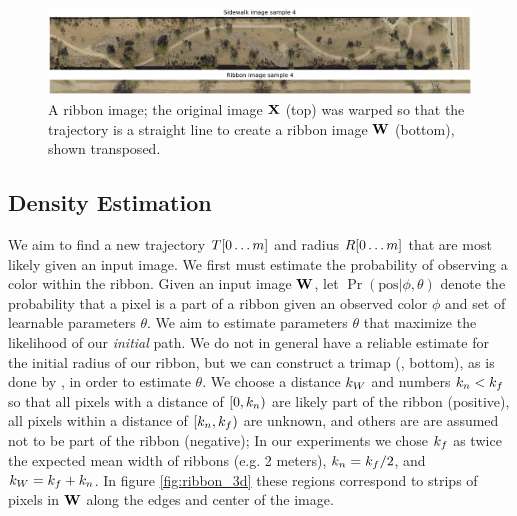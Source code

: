 
\begin{figure}[ht]
    \centering
    \includegraphics[width=0.95\columnwidth]{Figures/Sample4_needed.png}
    \caption[Sample Sidewalk]{A ribbon image; the original image $\mathbf{X}{}$ (top) was warped so that the trajectory is a straight line to create a ribbon image $\mathbf{W}{}$ (bottom), shown transposed.}
    \label{fig:Sample_Sidewalk_4}
\end{figure}

\subsection{Density Estimation}
We aim to find a new trajectory $T{[0\dots m]}$ and radius $R{[0\dots m]}$ that are most likely given an input image. We first must estimate the probability of observing a color within the ribbon.  
Given an input image $\mathbf{W}{}$, let $\Pr(\text{pos}|\phi,\theta)$ denote the probability that a pixel is a part of a ribbon given an observed color $\phi$ and set of learnable parameters $\theta$. 
We aim to estimate parameters $\theta$ that maximize the likelihood of our \textit{initial} path. 
We do not in general have a reliable estimate for the initial radius of our ribbon, 
but we can construct a trimap (, bottom), as is done by \GrabCut{}, in order to estimate $\theta$. We choose a distance $k_W$ and numbers $k_n < k_f$ 
so that all pixels with a distance of $[0, k_n)$ are likely part of the ribbon (positive), all pixels within a distance of $[k_n, k_f)$ are unknown, and others are are assumed not to be part of the ribbon (negative); 
In our experiments we chose  $k_f$ as twice the expected mean width of ribbons (e.g. 2 meters), $k_n = k_f/2$, and $k_W=k_f+k_n$.  
In figure \ref{fig:ribbon_3d} these regions correspond to strips of pixels in $\mathbf{W}{}$ along the edges and center of the image.

